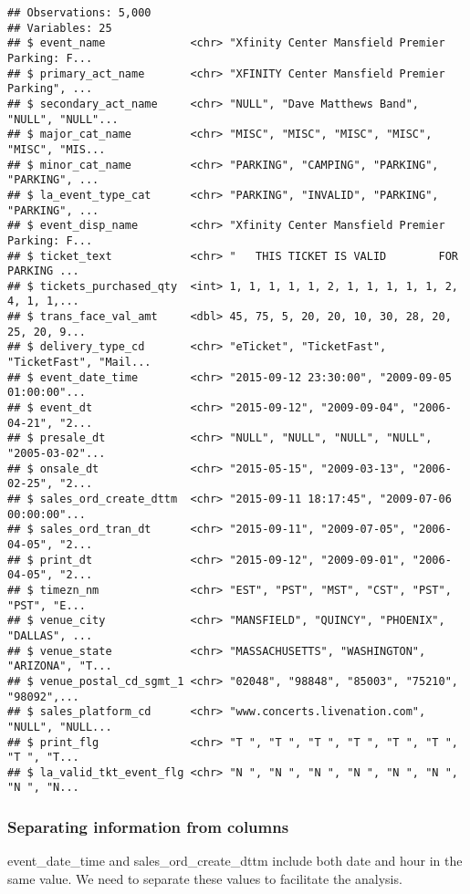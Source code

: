 \documentclass[]{article}
\begin{document}
\begin{verbatim}
## Observations: 5,000
## Variables: 25
## $ event_name             <chr> "Xfinity Center Mansfield Premier Parking: F...
## $ primary_act_name       <chr> "XFINITY Center Mansfield Premier Parking", ...
## $ secondary_act_name     <chr> "NULL", "Dave Matthews Band", "NULL", "NULL"...
## $ major_cat_name         <chr> "MISC", "MISC", "MISC", "MISC", "MISC", "MIS...
## $ minor_cat_name         <chr> "PARKING", "CAMPING", "PARKING", "PARKING", ...
## $ la_event_type_cat      <chr> "PARKING", "INVALID", "PARKING", "PARKING", ...
## $ event_disp_name        <chr> "Xfinity Center Mansfield Premier Parking: F...
## $ ticket_text            <chr> "   THIS TICKET IS VALID        FOR PARKING ...
## $ tickets_purchased_qty  <int> 1, 1, 1, 1, 1, 2, 1, 1, 1, 1, 1, 2, 4, 1, 1,...
## $ trans_face_val_amt     <dbl> 45, 75, 5, 20, 20, 10, 30, 28, 20, 25, 20, 9...
## $ delivery_type_cd       <chr> "eTicket", "TicketFast", "TicketFast", "Mail...
## $ event_date_time        <chr> "2015-09-12 23:30:00", "2009-09-05 01:00:00"...
## $ event_dt               <chr> "2015-09-12", "2009-09-04", "2006-04-21", "2...
## $ presale_dt             <chr> "NULL", "NULL", "NULL", "NULL", "2005-03-02"...
## $ onsale_dt              <chr> "2015-05-15", "2009-03-13", "2006-02-25", "2...
## $ sales_ord_create_dttm  <chr> "2015-09-11 18:17:45", "2009-07-06 00:00:00"...
## $ sales_ord_tran_dt      <chr> "2015-09-11", "2009-07-05", "2006-04-05", "2...
## $ print_dt               <chr> "2015-09-12", "2009-09-01", "2006-04-05", "2...
## $ timezn_nm              <chr> "EST", "PST", "MST", "CST", "PST", "PST", "E...
## $ venue_city             <chr> "MANSFIELD", "QUINCY", "PHOENIX", "DALLAS", ...
## $ venue_state            <chr> "MASSACHUSETTS", "WASHINGTON", "ARIZONA", "T...
## $ venue_postal_cd_sgmt_1 <chr> "02048", "98848", "85003", "75210", "98092",...
## $ sales_platform_cd      <chr> "www.concerts.livenation.com", "NULL", "NULL...
## $ print_flg              <chr> "T ", "T ", "T ", "T ", "T ", "T ", "T ", "T...
## $ la_valid_tkt_event_flg <chr> "N ", "N ", "N ", "N ", "N ", "N ", "N ", "N...
\end{verbatim}

\hypertarget{separating-information-from-columns}{%
\subsubsection{Separating information from
columns}\label{separating-information-from-columns}}

event\_date\_time and sales\_ord\_create\_dttm include both date and
hour in the same value. We need to separate these values to facilitate
the analysis.
\end{document}
